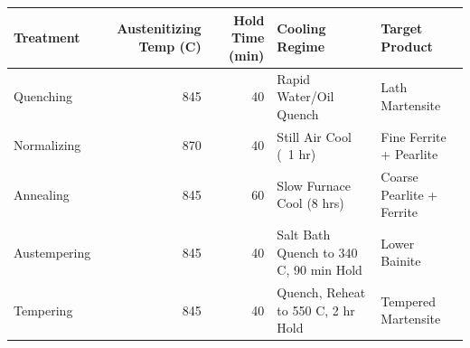 \begin{tabular}{lrrll}
\toprule
Treatment & Austenitizing Temp (C) & Hold Time (min) & Cooling Regime & Target Product \\
\midrule
Quenching & 845 & 40 & Rapid Water/Oil Quench & Lath Martensite \\
Normalizing & 870 & 40 & Still Air Cool (~1 hr) & Fine Ferrite + Pearlite \\
Annealing & 845 & 60 & Slow Furnace Cool (8 hrs) & Coarse Pearlite + Ferrite \\
Austempering & 845 & 40 & Salt Bath Quench to 340 C, 90 min Hold & Lower Bainite \\
Tempering & 845 & 40 & Quench, Reheat to 550 C, 2 hr Hold & Tempered Martensite \\
\bottomrule
\end{tabular}
